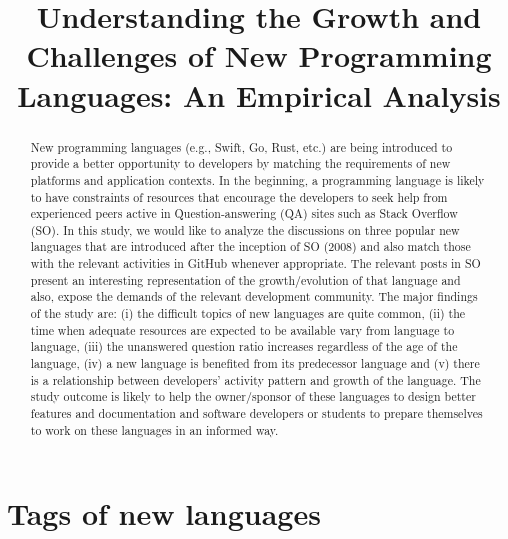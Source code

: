 \documentclass[acmsmall]{acmart}
\title{
Understanding the Growth and Challenges of New Programming Languages: An Empirical Analysis
}
\begin{document}
\newcommand{\rcomment}[1] { \textcolor{red}{#1}}
\newcommand{\boxtext}[1]{\begin{longfbox}#1\end{longfbox}}
\newcommand{\eqrow}[1]{
    \vbox{
        \begin{equation}
            \nonumber
            \begin{split}
                #1 \hspace{10em}
            \end{split}
        \end{equation}
        } \\
     }

\begin{abstract}
New programming languages (e.g., Swift, Go, Rust, etc.) are being introduced to provide a better opportunity to developers by matching the requirements of new platforms and application contexts. In the beginning, a programming language is likely to have constraints of resources that encourage the developers to seek help from experienced peers active in Question-answering (QA) sites such as Stack Overflow (SO). In this study, we would like to analyze the discussions on three popular new languages that are introduced after the inception of SO (2008) and also match those with the relevant activities in GitHub whenever appropriate. The relevant posts in SO present an interesting representation of the growth/evolution of that language and also, expose the demands of the relevant development community. The major findings of the study are: (i) the difficult topics of new languages are quite common, (ii) the time when adequate resources are expected to be available vary from language to language, (iii) the unanswered question ratio increases regardless of the age of the language, (iv) a new language is benefited from its predecessor language and (v) there is a relationship between developers' activity pattern and growth of the language. The study outcome is likely to help the owner/sponsor of these languages to design better features and documentation and software developers or students to prepare themselves to work on these languages in an informed way.
\end{abstract}
\maketitle














\pagebreak
\appendix
\section{Tags of new languages}
\label{appendix:tagrelevance}

    
\end{document}
